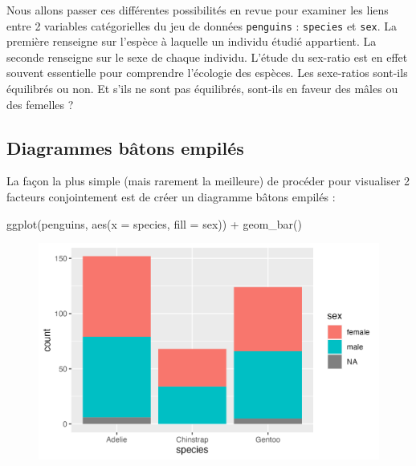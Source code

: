 \documentclass[
  letterpaper,
  DIV=11,
  numbers=noendperiod]{scrreprt}
\newenvironment{Shaded}{\begin{snugshade}}{\end{snugshade}}
\newcommand{\AttributeTok}[1]{\textcolor[rgb]{0.40,0.45,0.13}{#1}}
\newcommand{\FunctionTok}[1]{\textcolor[rgb]{0.28,0.35,0.67}{#1}}
\newcommand{\NormalTok}[1]{\textcolor[rgb]{0.00,0.23,0.31}{#1}}
\newcommand{\SpecialCharTok}[1]{\textcolor[rgb]{0.37,0.37,0.37}{#1}}
\begin{document}
Nous allons passer ces différentes possibilités en revue pour examiner
les liens entre 2 variables catégorielles du jeu de données
\texttt{penguins} : \texttt{species} et \texttt{sex}. La première
renseigne sur l'espèce à laquelle un individu étudié appartient. La
seconde renseigne sur le sexe de chaque individu. L'étude du sex-ratio
est en effet souvent essentielle pour comprendre l'écologie des espèces.
Les sexe-ratios sont-ils équilibrés ou non. Et s'ils ne sont pas
équilibrés, sont-ils en faveur des mâles ou des femelles ?

\hypertarget{diagrammes-buxe2tons-empiluxe9s}{%
\subsection{Diagrammes bâtons
empilés}\label{diagrammes-buxe2tons-empiluxe9s}}

La façon la plus simple (mais rarement la meilleure) de procéder pour
visualiser 2 facteurs conjointement est de créer un diagramme bâtons
empilés :

\begin{Shaded}
\begin{Highlighting}[]
\FunctionTok{ggplot}\NormalTok{(penguins, }\FunctionTok{aes}\NormalTok{(}\AttributeTok{x =}\NormalTok{ species, }\AttributeTok{fill =}\NormalTok{ sex)) }\SpecialCharTok{+}
  \FunctionTok{geom\_bar}\NormalTok{()}
\end{Highlighting}
\end{Shaded}

\begin{figure}[H]

{\centering \includegraphics{./03-visualization_files/figure-pdf/unnamed-chunk-54-1.png}

}

\end{figure}
\end{document}
